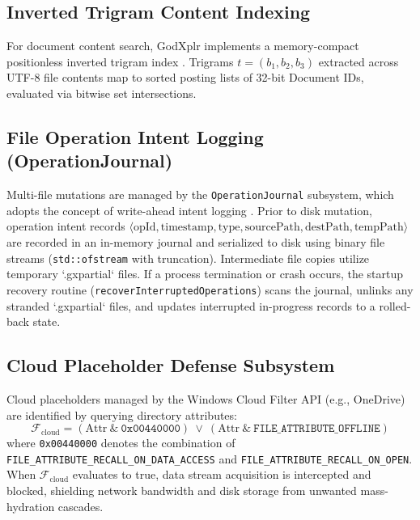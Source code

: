 \documentclass[conference]{IEEEtran}
\begin{document}
\subsection{Inverted Trigram Content Indexing}
For document content search, GodXplr implements a memory-compact positionless inverted trigram index \cite{zobel_inverted}. Trigrams $t = (b_1, b_2, b_3)$ extracted across UTF-8 file contents map to sorted posting lists of 32-bit Document IDs, evaluated via bitwise set intersections.

\subsection{File Operation Intent Logging (OperationJournal)}
Multi-file mutations are managed by the \texttt{OperationJournal} subsystem, which adopts the concept of write-ahead intent logging \cite{mohan_aries}. Prior to disk mutation, operation intent records $\langle \text{opId}, \text{timestamp}, \text{type}, \text{sourcePath}, \text{destPath}, \text{tempPath} \rangle$ are recorded in an in-memory journal and serialized to disk using binary file streams (\texttt{std::ofstream} with truncation). Intermediate file copies utilize temporary `.gxpartial` files. If a process termination or crash occurs, the startup recovery routine (\texttt{recoverInterruptedOperations}) scans the journal, unlinks any stranded `.gxpartial` files, and updates interrupted in-progress records to a rolled-back state.

\subsection{Cloud Placeholder Defense Subsystem}
Cloud placeholders managed by the Windows Cloud Filter API (e.g., OneDrive) are identified by querying directory attributes:
\begin{equation}
\mathcal{F}_{\text{cloud}} = (\text{Attr} \ \& \ \texttt{0x00440000}) \ \lor \ (\text{Attr} \ \& \ \texttt{FILE\_ATTRIBUTE\_OFFLINE})
\end{equation}
where \texttt{0x00440000} denotes the combination of \texttt{FILE\_ATTRIBUTE\_RECALL\_ON\_DATA\_ACCESS} and \texttt{FILE\_ATTRIBUTE\_RECALL\_ON\_OPEN}. When $\mathcal{F}_{\text{cloud}}$ evaluates to true, data stream acquisition is intercepted and blocked, shielding network bandwidth and disk storage from unwanted mass-hydration cascades.
\end{document}
